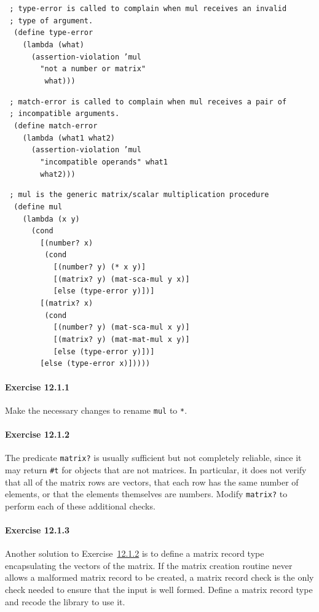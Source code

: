 \begin{alltt}
 ; type-error is called to complain when mul receives an invalid
 ; type of argument.
  (define type-error
    (lambda (what)
      (assertion-violation 'mul
        "not a number or matrix"
         what)))

 ; match-error is called to complain when mul receives a pair of
 ; incompatible arguments.
  (define match-error
    (lambda (what1 what2)
      (assertion-violation 'mul
        "incompatible operands" what1
        what2)))

 ; mul is the generic matrix/scalar multiplication procedure
  (define mul
    (lambda (x y)
      (cond
        [(number? x)
         (cond
           [(number? y) (* x y)]
           [(matrix? y) (mat-sca-mul y x)]
           [else (type-error y)])]
        [(matrix? x)
         (cond
           [(number? y) (mat-sca-mul x y)]
           [(matrix? y) (mat-mat-mul x y)]
           [else (type-error y)])]
        [else (type-error x)]))))
\end{alltt}

\paragraph{Exercise \label{examples_g153}12.1.1}


\label{examples_s4}Make the necessary changes to rename \texttt{mul} to \texttt{*}.


\paragraph{Exercise \label{examples_g154}12.1.2}


\label{examples_s5}\label{examples_exercise_reliable}
The predicate \texttt{matrix?} is usually sufficient but not completely
reliable, since it may return \texttt{\#{}t} for objects that are not
matrices.
In particular, it does not verify that all of the matrix rows are vectors,
that each row has the same number of elements, or that the elements
themselves are numbers.
Modify \texttt{matrix?} to perform each of these additional checks.


\paragraph{Exercise \label{examples_g155}12.1.3}


\label{examples_s6}Another solution to Exercise \hyperref[examples_g154]{12.1.2} is to define a matrix
record type encapsulating the vectors of the matrix.
If the matrix creation routine never allows a malformed matrix record
to be created, a matrix record check is the only check needed to ensure
that the input is well formed.
Define a matrix record type and recode the library to use it.


